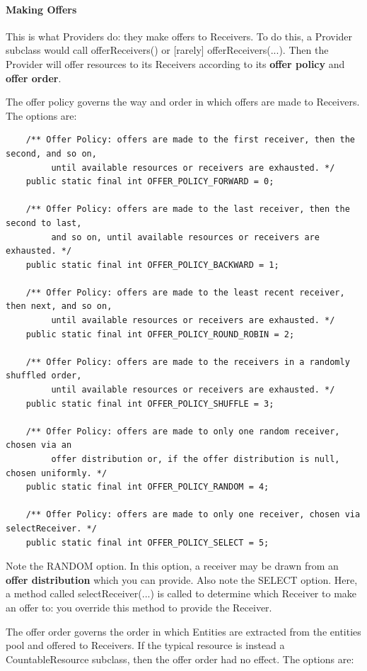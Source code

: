 \documentclass[twoside,10pt]{article}
\begin{document}
\paragraph{Making Offers}  This is what Providers do: they make offers to Receivers.  To do this, a Provider subclass would call offerReceivers() or [rarely] offerReceivers(...).  Then the Provider will offer resources to its Receivers according to its {\bf offer policy} and {\bf offer order}.

The offer policy governs the way and order in which offers are made to Receivers.  The options are:

\begin{verbatim}
    /** Offer Policy: offers are made to the first receiver, then the second, and so on, 
         until available resources or receivers are exhausted. */
    public static final int OFFER_POLICY_FORWARD = 0;
    
    /** Offer Policy: offers are made to the last receiver, then the second to last, 
         and so on, until available resources or receivers are exhausted. */
    public static final int OFFER_POLICY_BACKWARD = 1;
    
    /** Offer Policy: offers are made to the least recent receiver, then next, and so on, 
         until available resources or receivers are exhausted. */
    public static final int OFFER_POLICY_ROUND_ROBIN = 2;
    
    /** Offer Policy: offers are made to the receivers in a randomly shuffled order, 
         until available resources or receivers are exhausted. */
    public static final int OFFER_POLICY_SHUFFLE = 3;
    
    /** Offer Policy: offers are made to only one random receiver, chosen via an 
         offer distribution or, if the offer distribution is null, chosen uniformly. */
    public static final int OFFER_POLICY_RANDOM = 4;
    
    /** Offer Policy: offers are made to only one receiver, chosen via selectReceiver. */
    public static final int OFFER_POLICY_SELECT = 5;
\end{verbatim}

Note the RANDOM option.  In this option, a receiver may be drawn from an {\bf offer distribution} which you can provide.  Also note the SELECT option.  Here, a method called selectReceiver(...) is called to determine which Receiver to make an offer to: you override this method to provide the Receiver.
   
The offer order governs the order in which Entities are extracted from the entities pool and offered to Receivers.  If the typical resource is instead a CountableResource subclass, then the offer order had no effect.  The options are: 
    
\end{document}
